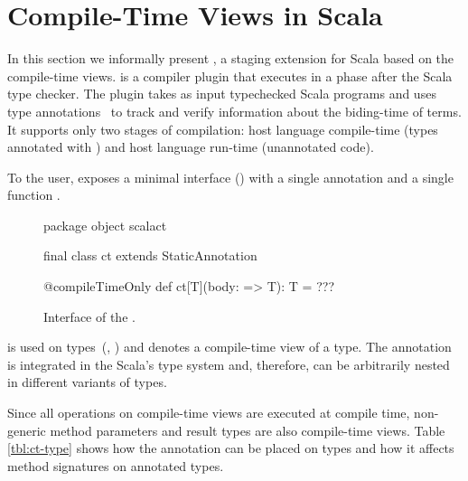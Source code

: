 \section{Compile-Time Views in Scala}
\label{sct:interface}

In this section we informally present \tool, a staging extension for Scala based on the compile-time views.
 \tool is a compiler plugin that executes in a phase after the
 Scala type checker. The plugin takes as input typechecked Scala programs and uses
 type annotations~\cite{odersky_1996_putting} to track and verify information about the biding-time
 of terms. It supports only two stages of compilation: host language compile-time
 (types annotated with ) and host language run-time (unannotated code).

To the user, \tool exposes a minimal interface () with
a single annotation  and a single function .

\begin{figure}
\begin{listing}
package object scalact {
  final class ct extends StaticAnnotation

  @compileTimeOnly def ct[T](body: => T): T = ???
}
\end{listing}
\label{fig:interface}
\caption{Interface of the \tool.}
\end{figure}

 is used on types~(\eg,
) and denotes a compile-time view of a type. The
annotation is integrated in the Scala's type system and, therefore, can be
arbitrarily nested in different variants of types.

Since all operations on compile-time views are executed at compile time, non-generic
 method parameters and result types are also compile-time views. Table \ref{tbl:ct-type}
 shows how the  annotation can be placed on types and how it affects method
 signatures on annotated types.

